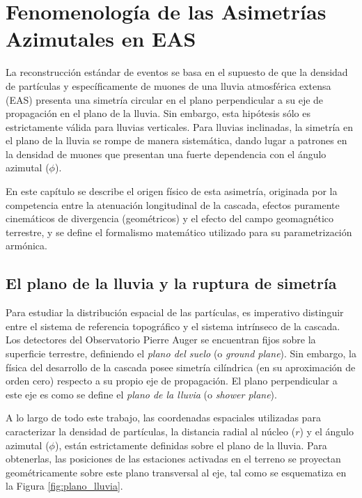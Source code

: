 
\section{Fenomenología de las Asimetrías Azimutales en EAS}
\label{sec:fenomenologia}

La reconstrucción estándar de eventos se basa en el supuesto de que la densidad de partículas y específicamente de muones de una lluvia atmosférica extensa (EAS) presenta una simetría circular en el plano perpendicular a su eje de propagación en el plano de la lluvia. Sin embargo, esta hipótesis sólo es estrictamente válida para lluvias verticales. Para lluvias inclinadas, la simetría en el plano de la lluvia se rompe de manera sistemática, dando lugar a patrones en la densidad de muones que presentan una fuerte dependencia con el ángulo azimutal ($\phi$).

En este capítulo se describe el origen físico de esta asimetría, originada por la competencia entre la atenuación longitudinal de la cascada, efectos puramente cinemáticos de divergencia (geométricos) y el efecto del campo geomagnético terrestre, y se define el formalismo matemático utilizado para su parametrización armónica.

\subsection{El plano de la lluvia y la ruptura de simetría}
\label{subsec:simetria_ruptura}

Para estudiar la distribución espacial de las partículas, es imperativo distinguir entre el sistema de referencia topográfico y el sistema intrínseco de la cascada. Los detectores del Observatorio Pierre Auger se encuentran fijos sobre la superficie terrestre, definiendo el \textit{plano del suelo} (o \textit{ground plane}). Sin embargo, la física del desarrollo de la cascada posee simetría cilíndrica (en su aproximación de orden cero) respecto a su propio eje de propagación. El plano perpendicular a este eje es como se define el \textit{plano de la lluvia} (o \textit{shower plane}).

A lo largo de todo este trabajo, las coordenadas espaciales utilizadas para caracterizar la densidad de partículas, la distancia radial al núcleo ($r$) y el ángulo azimutal ($\phi$), están estrictamente definidas sobre el plano de la lluvia. Para obtenerlas, las posiciones de las estaciones activadas en el terreno se proyectan geométricamente sobre este plano transversal al eje, tal como se esquematiza en la Figura \ref{fig:plano_lluvia}.

